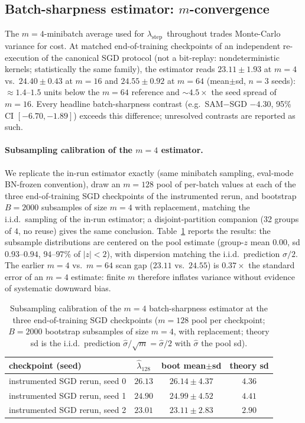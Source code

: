\documentclass{article}
\theoremstyle{plain}
\theoremstyle{definition}
\theoremstyle{remark}
\newcommand{\lstep}{\ensuremath{\lambda_{\mathrm{step}}}}
\newcommand{\RTableTopGap}{%
  \setlength{\abovetopsep}{2pt}%
}
\begin{document}
\FloatBarrier

\subsection{Batch-sharpness estimator: \texorpdfstring{$m$}{m}-convergence}
\label{sub:mconv}
The $m{=}4$-minibatch average used for
\lstep\ throughout trades Monte-Carlo variance for
cost. At matched end-of-training checkpoints of an independent
re-execution of the canonical SGD protocol (not a bit-replay: nondeterministic
kernels; statistically the same family), the estimator reads
$23.11\pm1.93$ at $m{=}4$ vs.\ $24.40\pm0.43$ at $m{=}16$ and
$24.55\pm0.92$ at $m{=}64$ (mean$\pm$sd, $n{=}3$ seeds):
${\approx}1.4$--$1.5$ units below the $m{=}64$ reference and
${\sim}4.5\times$ the seed spread of $m{=}16$. Every headline
batch-sharpness contrast (e.g.\ SAM$-$SGD $-4.30$, 95\% CI
$[{-}6.70,{-}1.89]$)
exceeds this difference; unresolved contrasts are reported as such.

\paragraph{Subsampling calibration of the $m{=}4$ estimator.}
\label{par:mcal}
We replicate the in-run estimator exactly (same minibatch sampling,
eval-mode BN-frozen convention), draw an $m{=}128$ pool of per-batch
values at each of the three end-of-training SGD checkpoints of the
instrumented rerun, and bootstrap $B{=}2000$ subsamples of size
$m{=}4$ with replacement, matching the i.i.d.\ sampling of the in-run
estimator; a disjoint-partition companion (32 groups of $4$, no reuse)
gives the same conclusion. Table~\ref{tab:mcal} reports the results:
the subsample distributions are centered on the pool estimate
(group-$z$ mean $0.00$, sd $0.93$--$0.94$, $94$--$97\%$ of $|z|<2$),
with dispersion matching the i.i.d.\ prediction $\hat\sigma/2$. The
earlier $m{=}4$ vs.\ $m{=}64$ scan gap ($23.11$ vs.\ $24.55$) is
$0.37\times$ the standard error of an $m{=}4$ estimate: finite $m$
therefore inflates variance without evidence of systematic downward
bias.

\begin{table}[!ht]
\centering\small
\caption{Subsampling calibration of the $m{=}4$ batch-sharpness
estimator at the three end-of-training SGD checkpoints ($m{=}128$
pool per checkpoint; $B{=}2000$ bootstrap subsamples of size $m{=}4$,
with replacement; theory sd is the i.i.d.\ prediction
$\hat\sigma/\sqrt{m}=\hat\sigma/2$ with $\hat\sigma$ the pool sd).}
\label{tab:mcal}
{\renewcommand{\arraystretch}{1.10}\RTableTopGap
\begin{tabular}{lccc}
\toprule
checkpoint (seed) & $\hat\lambda_{128}$ & boot mean$\pm$sd & theory sd \\
\midrule
instrumented SGD rerun, seed 0 & $26.13$ & $26.14\pm4.37$ & $4.36$ \\
instrumented SGD rerun, seed 1 & $24.90$ & $24.99\pm4.52$ & $4.41$ \\
instrumented SGD rerun, seed 2 & $23.01$ & $23.11\pm2.83$ & $2.90$ \\
\bottomrule
\end{tabular}}
\end{table}
\end{document}
